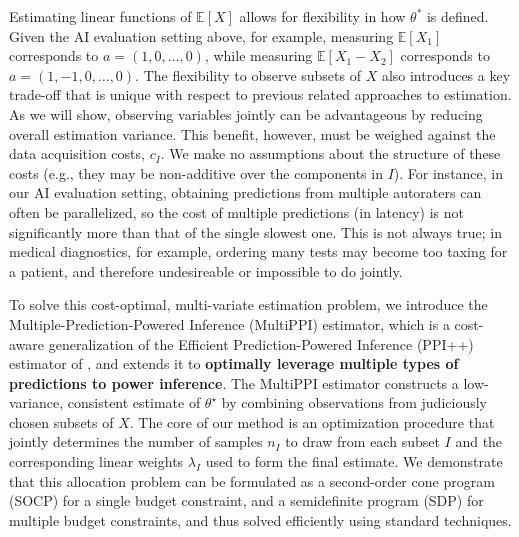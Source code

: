 \documentclass{article} %
\newcommand{\Ex}{\mathbb{E}}
\begin{document}
Estimating linear functions of $\Ex[X]$ allows for flexibility in how $\theta^*$ is defined. Given the AI evaluation setting above, for example, measuring $\Ex[X_1]$ corresponds to  $a=(1,0,\ldots,0)$, while measuring  $\Ex[X_1 - X_2]$ corresponds to  $a=(1,{-}1,0,\ldots,0)$. 
The flexibility to observe subsets of $X$ also introduces a key trade-off that is unique with respect to previous related approaches to estimation. As we will show, observing variables jointly can be advantageous by reducing overall estimation variance. This benefit, however, must be weighed against the data acquisition costs, $c_I$. We make no assumptions about the structure of these costs (e.g., they may be non-additive over the components in $I$). For instance, in our AI evaluation setting, obtaining predictions from multiple autoraters can often be parallelized, so the cost of multiple predictions (in latency) is not significantly more than that of the single slowest one. This is not always true; in medical diagnostics, for example, ordering many tests may become too taxing for a patient, and therefore undesireable or impossible to do jointly.



To solve this cost-optimal, multi-variate estimation problem,  we introduce the Multiple-Prediction-Powered Inference (MultiPPI) estimator, which is a cost-aware generalization of the Efficient Prediction-Powered Inference (PPI{++}) estimator of \citet{angelopoulos2023ppi++}, and extends it to \textbf{optimally leverage multiple types of predictions to power inference}. The MultiPPI estimator constructs a low-variance, consistent estimate of $\theta^\star$ by combining observations from judiciously chosen subsets of $X$. The core of our method is an optimization procedure that jointly determines the number of samples $n_I$ to draw from each subset $I$ and the corresponding linear weights $\lambda_I$ used to form the final estimate. We demonstrate that this allocation problem can be formulated as a second-order cone program (SOCP) for a single budget constraint, and a semidefinite program (SDP) for multiple budget constraints, and thus solved efficiently using standard techniques.
\end{document}
